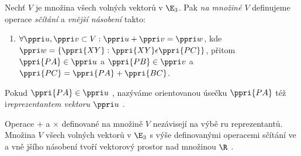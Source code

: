 \Def  Nechť $V$ je množina všech volných vektorů v $\E_3$. Pak \emph{na množiné $V$} definujeme operace \emph{sčítání} a \emph{vnější násobení} takto:
\begin{enumerate}
	\item $\forall \ppri u, \ppri v \subset V : \ppri u + \ppri v = \ppri w$, kde $\ppri w = \{\ppri{XY}:\ppri{XY}\epsilon\ppri{PC}\}$, přitom $\ppri{PA}\in\ppri u$ a $\ppri{PB} \in \ppri v$  a $\ppri{PC} = \ppri{PA} + \ppri{BC}$.
\end{enumerate}

\Def Pokud $\ppri{PA}\in\ppri u$ , nazýváme orientovanou úsečku $\ppri{PA}$ též i\emph{reprezentantem vektoru} $\ppri u$ .

\V Operace $+$ a $\times$ definované na množině $V$ nezávisejí na výbě ru reprezentantů.
\V Množina $V$ všech volných vektorů v $\E_3$ s výše definovanými operacemi sčítání ve
a vně jšího násobení tvoří vektorový prostor nad množinou $\R$ .
\EndDoc

